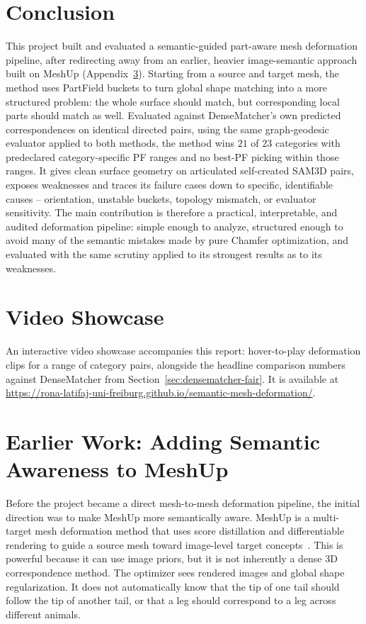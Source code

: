 \documentclass{article}
\begin{document}
\section{Conclusion}

This project built and evaluated a semantic-guided part-aware mesh deformation pipeline, after 
redirecting away
from an earlier, heavier image-semantic approach built on MeshUp (Appendix~\ref{app:meshup}).
Starting from a source and target mesh, the method uses PartField buckets to turn global shape
matching into a more structured problem: the whole surface should match, but corresponding local
parts should match as well. Evaluated against DenseMatcher's own predicted correspondences on
identical directed pairs, using the same graph-geodesic evaluator applied to both methods, the method
 wins $21$ of $23$ categories with
predeclared category-specific PF ranges and no best-PF picking within those ranges. It gives clean
surface geometry on articulated self-created
SAM3D pairs, exposes weaknesses and traces its failure cases down to specific, identifiable 
causes -- orientation, unstable
buckets, topology mismatch, or evaluator sensitivity. The main contribution is therefore a practical, 
interpretable, and audited
deformation pipeline: simple enough to analyze, structured enough to avoid many of the semantic
mistakes made by pure Chamfer optimization, and evaluated with the same scrutiny applied to its
strongest results as to its weaknesses.

\clearpage
\appendix

\section{Video Showcase}
\label{app:supplementary}

An interactive video showcase accompanies this report: hover-to-play deformation clips for a range
of category pairs, alongside the headline comparison numbers against DenseMatcher from
Section~\ref{sec:densematcher-fair}. It is available at
\url{https://rona-latifaj-uni-freiburg.github.io/semantic-mesh-deformation/}.

\section{Earlier Work: Adding Semantic Awareness to MeshUp}
\label{app:meshup}

Before the project became a direct mesh-to-mesh deformation pipeline, the initial direction was to
make MeshUp more semantically aware. MeshUp is a multi-target mesh deformation method that uses
score distillation and differentiable rendering to guide a source mesh toward image-level target
concepts~\cite{meshup}. This is powerful because it can use image priors, but it is not inherently a
dense 3D correspondence method. The optimizer sees rendered images and global shape regularization.
It does not automatically know that the tip of one tail should follow the tip of another tail, or
that a leg should correspond to a leg across different animals.
\end{document}
